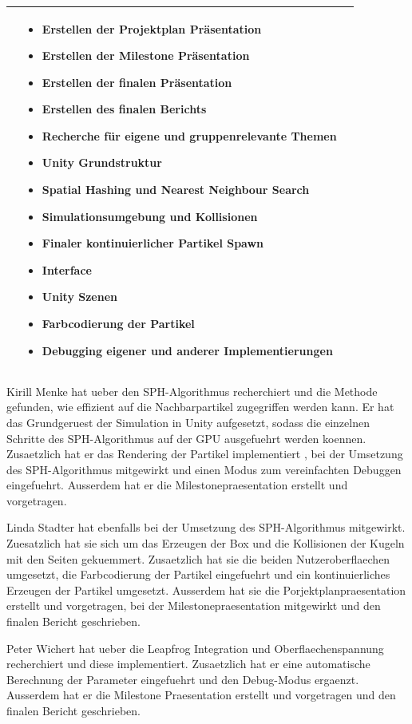 \documentclass[a4paper]{paper}
\begin{document}
\begin{center}
\begin{tabularx}{\textwidth}{ 
		| >{\raggedright\arraybackslash}X 
		| >{\raggedright\arraybackslash}X 
		| >{\raggedright\arraybackslash}X | }
&
\begin{itemize}
\item Erstellen der Projektplan Präsentation
\item Erstellen der Milestone Präsentation
\item Erstellen der finalen Präsentation
\item Erstellen des finalen Berichts
\item Recherche für eigene und gruppenrelevante Themen
\item Unity Grundstruktur
\item Spatial Hashing und Nearest Neighbour Search
\item Simulationsumgebung und Kollisionen
\item Finaler kontinuierlicher Partikel Spawn
\item Interface
\item Unity Szenen
\item Farbcodierung der Partikel
\item Debugging eigener und anderer Implementierungen
\end{itemize}
\\
\hline

\end{tabularx}
\end{center}

\iffalse

Kirill Menke hat ueber den SPH-Algorithmus recherchiert und die Methode gefunden, wie 
effizient auf die Nachbarpartikel zugegriffen werden kann. Er hat das Grundgeruest der Simulation in Unity aufgesetzt, sodass die einzelnen Schritte des SPH-Algorithmus auf der GPU ausgefuehrt werden koennen. Zusaetzlich hat er das Rendering der Partikel implementiert , bei der Umsetzung des SPH-Algorithmus mitgewirkt und einen Modus zum vereinfachten Debuggen eingefuehrt. Ausserdem hat er die Milestonepraesentation erstellt und vorgetragen. 

Linda Stadter hat ebenfalls bei der Umsetzung des SPH-Algorithmus mitgewirkt. Zuesatzlich hat sie sich um das Erzeugen der Box und die Kollisionen der Kugeln mit den Seiten gekuemmert. Zusaetzlich hat sie die beiden Nutzeroberflaechen umgesetzt, die Farbcodierung der Partikel eingefuehrt und ein kontinuierliches Erzeugen der Partikel umgesetzt. Ausserdem hat sie die Porjektplanpraesentation erstellt und vorgetragen, bei der Milestonepraesentation mitgewirkt und den finalen Bericht geschrieben.

Peter Wichert hat ueber die Leapfrog Integration und Oberflaechenspannung recherchiert und diese implementiert. Zusaetzlich hat er eine automatische Berechnung der Parameter eingefuehrt und den Debug-Modus ergaenzt. Ausserdem hat er die Milestone Praesentation erstellt und vorgetragen und den finalen Bericht geschrieben.
\end{document}
